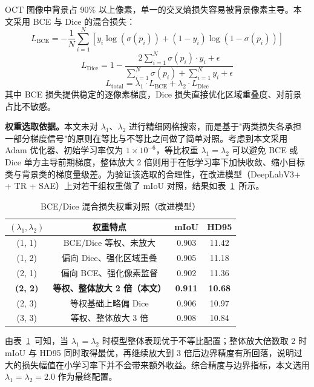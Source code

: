 OCT 图像中背景占 90\% 以上像素，单一的交叉熵损失容易被背景像素主导。本文采用 BCE 与 Dice 的混合损失：
\begin{equation}
L_{\text{BCE}} = -\frac{1}{N} \sum_{i=1}^{N} \left[ y_i \log(\sigma(p_i)) + (1-y_i) \log(1-\sigma(p_i)) \right]
\label{eq:bce_loss}
\end{equation}
\begin{equation}
L_{\text{Dice}} = 1 - \frac{2 \sum_{i=1}^{N} \sigma(p_i) \cdot y_i + \epsilon}{\sum_{i=1}^{N} \sigma(p_i) + \sum_{i=1}^{N} y_i + \epsilon}
\label{eq:dice_loss}
\end{equation}
\begin{equation}
L_{\text{total}} = \lambda_1 \cdot L_{\text{BCE}} + \lambda_2 \cdot L_{\text{Dice}}
\label{eq:total_loss}
\end{equation}
其中 BCE 损失提供稳定的逐像素梯度，Dice 损失直接优化区域重叠度、对前景占比不敏感。

\textbf{权重选取依据。}本文未对 $\lambda_1$、$\lambda_2$ 进行精细网格搜索，而是基于"两类损失各承担一部分梯度信号"的原则在等比与不等比之间做了简单对照。考虑到本文采用 Adam 优化器、初始学习率仅为 $1\times 10^{-6}$，等比权重 $\lambda_1=\lambda_2$ 可以避免 BCE 或 Dice 单方主导前期梯度，整体放大 2 倍则用于在低学习率下加快收敛、缩小目标类与背景类的梯度量级差。为验证该选取的合理性，在改进模型（DeepLabV3+ + TR + SAE）上对若干组权重做了 mIoU 对照，结果如表~\ref{tab:loss_weight}~所示。

\begin{table}[htbp]
\centering
\renewcommand\arraystretch{1.4}
\caption{BCE/Dice 混合损失权重对照（改进模型）}
\label{tab:loss_weight}
\begin{tabular}{cccc}
\toprule
$(\lambda_1, \lambda_2)$ & 权重特点 & mIoU & HD95 \\
\midrule
(1, 1) & BCE/Dice 等权、未放大 & 0.903 & 11.42 \\
(1, 2) & 偏向 Dice、强化区域重叠 & 0.905 & 11.18 \\
(2, 1) & 偏向 BCE、强化像素监督 & 0.902 & 11.36 \\
\textbf{(2, 2)} & \textbf{等权、整体放大 2 倍（本文）} & \textbf{0.911} & \textbf{10.68} \\
(2, 3) & 等权基础上略偏 Dice & 0.906 & 10.97 \\
(3, 3) & 等权、整体放大 3 倍 & 0.908 & 10.84 \\
\bottomrule
\end{tabular}
\end{table}

由表~\ref{tab:loss_weight}~可知，当 $\lambda_1=\lambda_2$ 时模型整体表现优于不等比配置；整体放大倍数取 2 时 mIoU 与 HD95 同时取得最优，再继续放大到 3 倍后边界精度有所回落，说明过大的损失幅值在小学习率下并不会带来额外收益。综合精度与边界指标，本文选用 $\lambda_1=\lambda_2=2.0$ 作为最终配置。

